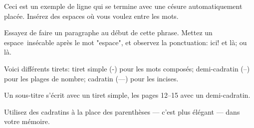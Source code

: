 \documentclass[12pt]{article}
\begin{document}
	Ceci est un exemple de ligne qui se termine avec une césure automatiquement placée.
	Insérez      des     espaces    où vous    voulez
	entre
	les mots.

	Essayez de faire un paragraphe au début de cette phrase. Mettez un espace~insécable après le mot "espace", et observez la ponctuation: ici! et là; ou là.

	Voici différents tirets: tiret simple (-) pour les mots composés; demi-cadratin (--) pour les plages de nombre; cadratin (---) pour les incises.

	Un sous-titre s'écrit avec un tiret simple, les pages 12--15 avec un demi-cadratin.



	Utilisez des cadratins à la place des parenthèses --- c'est plus élégant --- dans votre mémoire.

\end{document}

